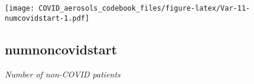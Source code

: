 \documentclass[]{article}
\begin{document}
\begin{minipage}{0.25 \textwidth}

\texttt{[image: COVID\_aerosols\_codebook\_files/figure-latex/Var-11-numcovidstart-1.pdf]}

\end{minipage}

\noindent\makebox[\linewidth]{\rule{\textwidth}{0.4pt}}

\hypertarget{numnoncovidstart}{%
\subsection{numnoncovidstart}\label{numnoncovidstart}}

\emph{Number of non-COVID patients}

\begin{minipage}{0.75 \textwidth}


\end{minipage}
\end{document}
